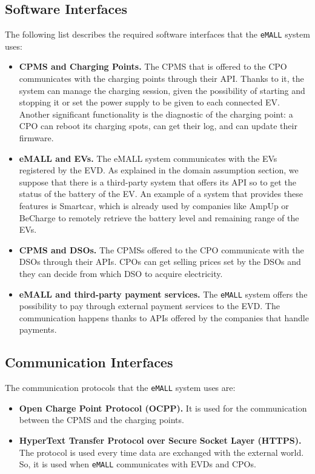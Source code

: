 \subsection{Software Interfaces}
\label{subsec:software_interfaces}%
The following list describes the required software interfaces that the \verb|eMALL| system uses:
\begin{itemize}
    \item \textbf{CPMS and Charging Points.} The CPMS that is offered to the CPO communicates with the charging points
    through their API\@.
    Thanks to it, the system can manage the charging session, given the possibility of starting and stopping it or set
    the power supply to be given to each connected EV\@.
    Another significant functionality is the diagnostic of the charging point:
    a CPO can reboot its charging spots, can get their log, and can update their firmware.
    \item \textbf{eMALL and EVs.} The eMALL system communicates with the EVs registered by the EVD\@.
    As explained in the domain assumption section, we suppose that there is a third-party system that offers its API
    so to get the status of the battery of the EV\@.
    An example of a system that provides these features is Smartcar,
    which is already used by companies like AmpUp or BeCharge to remotely retrieve the battery level and remaining range of the EVs.
    \item \textbf{CPMS and DSOs.} The CPMSs offered to the CPO communicate with the DSOs through their APIs.
    CPOs can get selling prices set by the DSOs and they can decide from which DSO to acquire electricity.
    \item \textbf{eMALL and third-party payment services.} The \verb|eMALL| system offers the possibility to pay through
    external payment services to the EVD. The communication happens thanks to APIs offered by the companies that handle payments.
\end{itemize}

\subsection{Communication Interfaces}
\label{subsec:communication_interfaces}%
The communication protocols that the \verb|eMALL| system uses are:
\begin{itemize}
    \item \textbf{Open Charge Point Protocol (OCPP).} It is used for the communication between the CPMS and the charging
    points.
    \item \textbf{HyperText Transfer Protocol over Secure Socket Layer (HTTPS).} The protocol is used every time data are
    exchanged with the external world.
    So, it is used when \verb|eMALL| communicates with EVDs and CPOs.
\end{itemize}


